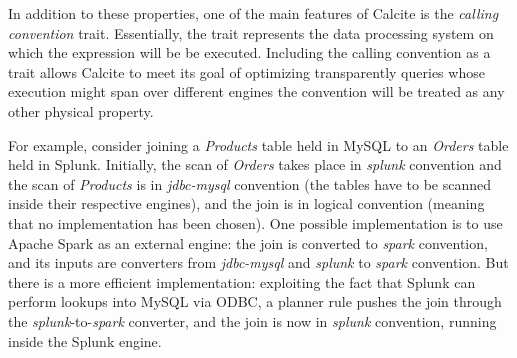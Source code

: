 In addition to these properties, one of the main features of Calcite is the \textit{calling convention} trait. Essentially, the trait represents the data processing system on which the expression will be be executed. Including the calling convention as a trait allows Calcite to meet its goal of optimizing transparently queries whose execution might span over different engines \ie the convention will be treated as any other physical property.

For example, consider joining a \textit{Products} table held in MySQL to an \textit{Orders} table held in Splunk. Initially, the scan of \textit{Orders} takes place in \textit{splunk} convention and the scan of \textit{Products} is in \textit{jdbc-mysql} convention (the tables have to be scanned inside their respective engines), and the join is in logical convention (meaning that no implementation has been chosen). One possible implementation is to use Apache Spark as an external engine: the join is converted to \textit{spark} convention, and its inputs are converters from \textit{jdbc-mysql} and \textit{splunk} to \textit{spark} convention. But there is a more efficient implementation: exploiting the fact that Splunk can perform lookups into MySQL via ODBC, a planner rule pushes the join through the \textit{splunk}-to-\textit{spark} converter, and the join is now in \textit{splunk} convention, running inside the Splunk engine.

